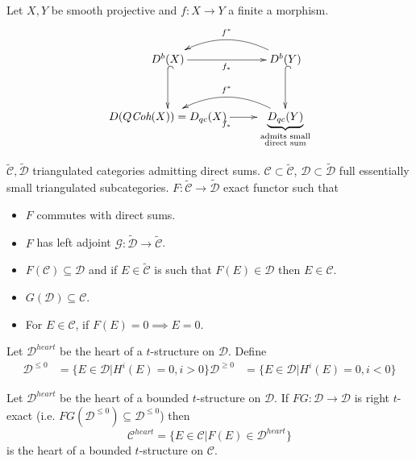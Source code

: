\begin{example}
\label{example-}
Let $X,Y$ be smooth projective and $f:X \to
Y$ a finite a morphism.
$$
\xymatrix{
D^b(X)\ar[r]_{f_*} \ar@{^{(}->}[d]
&D^b(Y)
\ar@/_{1.5pc}/[l]_{f^*}\ar@{^{(}->}[d]\\
D(Q\textit{Coh}(X))=D_{qc}(X)\ar[r]_{f_*}
&\underbrace{D_{qc}(Y)
}_{\substack{\text{admits
small} \\ \text{direct sum}}}
\ar@/_{1.5pc}/[l]_{f^*}
}
$$
\end{example}

\begin{situation}
\label{situation-}
$\tilde{\mathcal{C}},\tilde{\mathcal{D}}$
triangulated categories admitting direct
sums. $\mathcal{C}\subset
\tilde{\mathcal{C}}$, $\mathcal{D}
\subset\tilde{\mathcal{D}}$ full essentially
small triangulated subcategories.
$F:\tilde{\mathcal{C}}\to
\tilde{\mathcal{D}}$ exact functor such that
\begin{itemize}
\item $F$ commutes with direct sums.
\item $F$ has left adjoint
$\mathcal{G}:\tilde{\mathcal{D}}\to
\tilde{\mathcal{C}}$.
\item $F(\mathcal{C}) \subseteq \mathcal{D}$
and if $E \in \tilde{\mathcal{C}}$
is such that $F(E) \in \mathcal{D}$ then $E
\in \mathcal{C}$.
\item $G(\mathcal{D}) \subseteq \mathcal{
C}$.
\item For $E \in \mathcal{C}$, if $F(E)=0
\implies E=0$.
\end{itemize}
\end{situation}

\begin{definition}
\label{nasak-label-004}
Let $\mathcal{D}^{heart}$ be the heart of a
$t$-structure on $\mathcal{D}$. Define
$$
\begin{aligned}
\mathcal{D}^{\leq 0}&=\{E \in
\mathcal{D}|H^{i}(E)=0, i>0\}
\mathcal{D}^{\geq 0}&=\{E \in
\mathcal{D}|H^{i}(E)=0, i<0\}
\end{aligned}
$$
\end{definition}

\begin{theorem}[Polischuk]
\label{theorem-Polischuk}
Let $\mathcal{D}^{heart}$ be the heart of a
bounded $t$-structure on $\mathcal{D}$. If
$FG:\mathcal{D} \to \mathcal{D}$ is right
$t$-exact (i.e. $FG(\mathcal{D}^{\leq
0})\subseteq \mathcal{D}^{\leq 0}$) then
$$
\mathcal{C}^{heart}=\{E \in \mathcal{C}|F(E)
\in \mathcal{D}^{heart}\}
$$
is the heart of a bounded $t$-structure on
$\mathcal{C}$.
\end{theorem}

